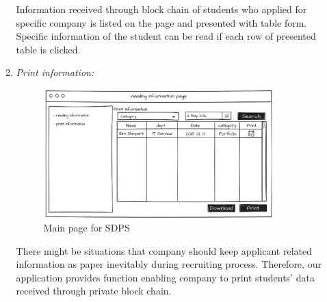 \documentclass[conference]{IEEEtran}
\begin{document}
\begin{enumerate}
\begin{enumerate}
	Information received through block chain of students who applied for specific company is listed on the page and presented with table form. Specific information of the student can be read if each row of presented table is clicked.\\
        \item  \textit {Print information:} 
         \begin{figure}[htbp]
	\centerline{\includegraphics[width=89mm,scale=0.5]{company/func2.png}}
	\caption{Main page for SDPS}
	\label{fig}
	\end{figure}
        
        There might be situations that company should keep applicant related information as paper inevitably during recruiting process. Therefore, our application provides function enabling company to print students’ data received through private block chain.\\
    \end{enumerate}
        
\end{enumerate}
\end{document}
